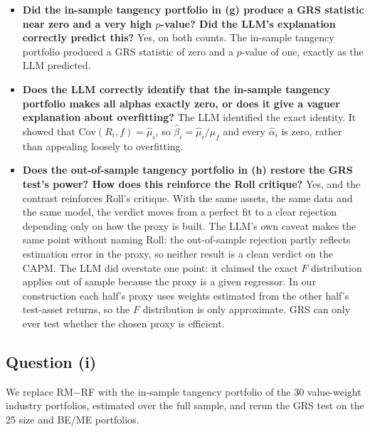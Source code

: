 \begin{itemize}
\setlength{\itemsep}{4pt}\setlength{\parskip}{0pt}

\item[(i)] \textbf{Did the in-sample tangency portfolio in (g) produce a
GRS statistic near zero and a very high $p$-value? Did the LLM's explanation
correctly predict this?} Yes, on both counts. The in-sample tangency portfolio
produced a GRS statistic of zero and a $p$-value of one, exactly as the LLM
predicted.

\item[(ii)] \textbf{Does the LLM correctly identify that the in-sample
tangency portfolio makes all alphas exactly zero, or does it give a vaguer
explanation about overfitting?} The LLM identified the exact identity. It
showed that
$\mathrm{Cov}(R_i, f) = \hat\mu_i$, so $\hat\beta_i = \hat\mu_i/\mu_f$ and
every $\hat\alpha_i$ is zero, rather than appealing loosely to overfitting.

\item[(iii)] \textbf{Does the out-of-sample tangency portfolio in (h)
restore the GRS test's power? How does this reinforce the Roll critique?}
Yes, and the contrast reinforces Roll's critique.
With the same assets, the same data and the same model, the verdict moves
from a perfect fit to a clear rejection depending only on how the proxy is
built. The LLM's own caveat makes the same point without naming Roll: the
out-of-sample rejection partly reflects estimation error in the proxy, so
neither result is a clean verdict on the CAPM. The LLM did overstate one point: it claimed the exact $F$ distribution applies out of sample because the proxy is a given regressor. In our construction each half's proxy uses weights estimated from the other half's test-asset returns, so the $F$ distribution is only approximate. GRS can only ever test
whether the chosen proxy is efficient.

\end{itemize}

\subsection{Question (i)}

We replace RM$-$RF with the in-sample tangency portfolio of the 30
value-weight industry portfolios, estimated over the full sample, and rerun
the GRS test on the 25 size and BE/ME portfolios.

